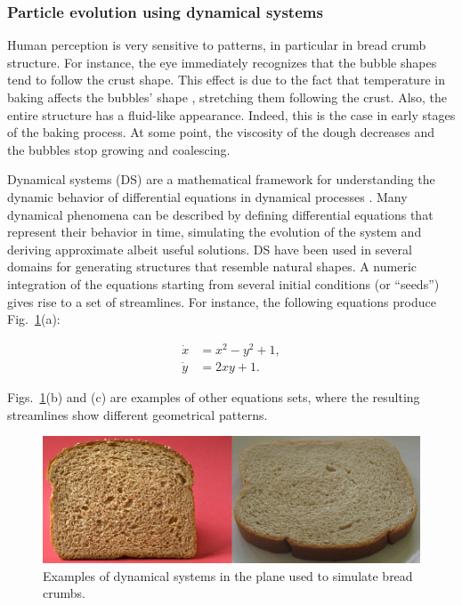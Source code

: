 \subsubsection*{Particle evolution using dynamical systems}

Human perception is very sensitive to patterns, in particular in bread crumb structure.
For instance, the eye immediately recognizes that the bubble shapes tend to follow the crust shape.
This effect is due to the fact that temperature in baking affects the bubbles' shape \cite{Scanlon2001}, stretching them following the crust.
Also, the entire structure has a fluid-like appearance.
Indeed, this is the case in early stages of the baking process.
At some point, the viscosity of the dough decreases and the bubbles stop growing and
coalescing.

Dynamical systems (DS) are a mathematical framework for understanding the dynamic behavior of
differential equations in dynamical processes \cite{Strogatz2001}.
Many dynamical phenomena can be described by defining differential equations that represent their behavior in time, simulating the evolution of the system and deriving approximate albeit useful solutions.
DS have been used in several domains for generating structures that resemble natural shapes.
A numeric integration of the equations starting from several initial conditions (or ``seeds'') gives rise to a set of streamlines.
For instance, the following equations produce Fig.~\ref{fg:fig3}(a):

\begin{equation} \label{eq:image_dynamics}  
  \begin{aligned}
    \dot{x} &= x^{2}-y^{2}+1,\\
    \dot{y} &= 2xy+1.
  \end{aligned}
\end{equation}

Figs.~\ref{fg:fig3}(b) and (c) are examples of other equations sets, where the resulting streamlines show different geometrical patterns.


\begin{figure}
  \centerline{\includegraphics[width=13cm]{panreal}}
  \caption{Examples of dynamical systems in the plane used to simulate bread crumbs.}
  \label{fg:fig3}
\end{figure}


